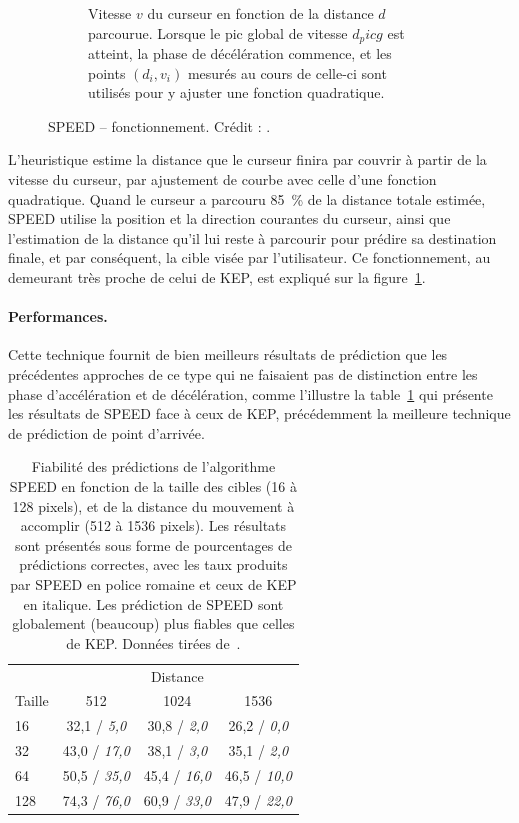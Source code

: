 \begin{figure}[!htbp]
\begin{subfigure}[t]{0.49\textwidth}
			\caption{Vitesse $v$ du curseur en fonction de la distance $d$ parcourue. Lorsque le pic global de vitesse $d_picg$ est atteint, la phase de décélération commence, et les points $(d_{i}, v_{i})$ mesurés au cours de celle-ci sont utilisés pour y ajuster une fonction quadratique.}
			\label{fig:speedExplained}
		\end{subfigure}
		\caption[SPEED -- fonctionnement]{SPEED -- fonctionnement. Crédit : \cite{wonner2011speed}.}
		\label{fig:speedCursor}
	\end{figure}
	
	L'heuristique estime la distance que le curseur finira par couvrir à partir de la vitesse du curseur, par ajustement de courbe avec celle d'une fonction quadratique. Quand le curseur a parcouru 85~\%{} de la distance totale estimée, SPEED utilise la position et la direction courantes du curseur, ainsi que l'estimation de la distance qu'il lui reste à parcourir pour prédire sa destination finale, et par conséquent, la cible visée par l'utilisateur. Ce fonctionnement, au demeurant très proche de celui de KEP, est expliqué sur la figure~\ref{fig:speedExplained}.
	
	\paragraph{Performances.}
	Cette technique fournit de bien meilleurs résultats de prédiction que les précédentes approches de ce type qui ne faisaient pas de distinction entre les phase d'accélération et de décélération, comme l'illustre la table~\ref{tab:speedingPastKep} qui présente les résultats de SPEED face à ceux de KEP, précédemment la meilleure technique de prédiction de point d'arrivée.
	
	\begin{table}
	\centering
	\begin{tabular}{l | c c c}
				& \multicolumn{3}{c}{Distance}	\\
		Taille	& 512					& 1024					& 1536					\bigstrut[b] \\ \hline
		16		& 32,1 / \emph{5,0}		& 30,8 / \emph{2,0}		& 26,2 / \emph{0,0}		\bigstrut[t] \\
		32		& 43,0 / \emph{17,0}	& 38,1 / \emph{3,0}		& 35,1 / \emph{2,0}		\\
		64		& 50,5 / \emph{35,0}	& 45,4 / \emph{16,0}	& 46,5 / \emph{10,0}	\\
		128		& 74,3 / \emph{76,0}	& 60,9 / \emph{33,0}	& 47,9 / \emph{22,0}	\\
	\end{tabular}
	\caption[SPEED -- performances comparées à celles de KEP]{Fiabilité des prédictions de l'algorithme SPEED en fonction de la taille des cibles (16 à 128 pixels), et de la distance du mouvement à accomplir (512 à 1536 pixels). Les résultats sont présentés sous forme de pourcentages de prédictions correctes, avec les taux produits par SPEED en police romaine et ceux de KEP en italique. Les prédiction de SPEED sont globalement (beaucoup) plus fiables que celles de KEP. Données tirées de~\cite{wonner2011speed}.}
	\label{tab:speedingPastKep}
	\end{table}
	
